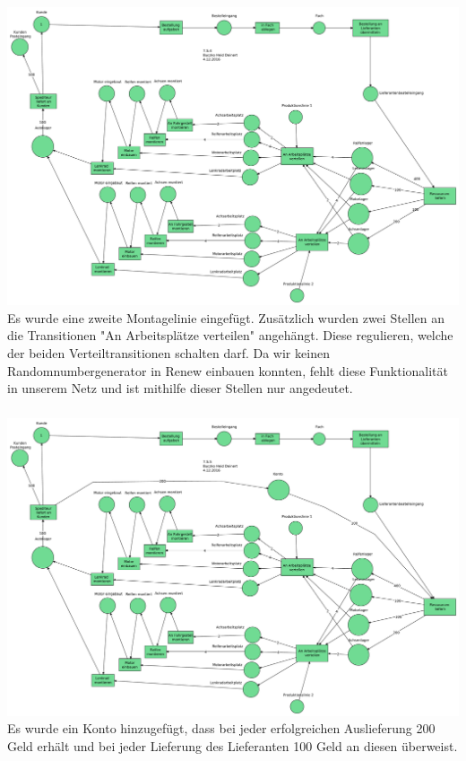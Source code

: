 \documentclass[a4paper,12pt]{scrartcl}
\begin{document}
\subsubsection{}
\includegraphics[scale=0.3]{G-6-A-07-Netz5-Buczko_Heid_Deinert.pdf}\\
Es wurde eine zweite Montagelinie eingefügt. Zusätzlich wurden zwei Stellen an die Transitionen "An Arbeitsplätze verteilen" angehängt. Diese 
regulieren, welche der beiden Verteiltransitionen schalten darf.
Da wir keinen Randomnumbergenerator in Renew einbauen konnten, 
fehlt diese Funktionalität in unserem Netz und ist mithilfe dieser Stellen nur angedeutet.

\subsubsection{}
\includegraphics[scale=0.3]{G-6-A-07-Netz6-Buczko_Heid_Deinert.pdf}\\
Es wurde ein Konto hinzugefügt, dass bei jeder erfolgreichen Auslieferung 200 Geld erhält und bei jeder Lieferung des Lieferanten 100 Geld an diesen überweist.
\end{document}
